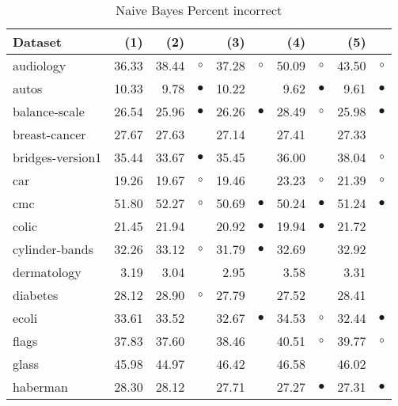 \begin{table}[H]
\caption{\label{nbpi}Naive Bayes Percent incorrect}
\footnotesize
{\centering \begin{tabular}{lrr@{\hspace{0.1cm}}cr@{\hspace{0.1cm}}cr@{\hspace{0.1cm}}cr@{\hspace{0.1cm}}c}
\\
\hline
Dataset & (1)& (2) & & (3) & & (4) & & (5) & \\
\hline
audiology & 36.33 & 38.44 &   $\circ$ & 37.28 &   $\circ$ & 50.09 &    $\circ$ & 43.50 &    $\circ$\\
autos & 10.33 &  9.78 & $\bullet$ & 10.22 &           &  9.62 &  $\bullet$ &  9.61 &  $\bullet$\\
balance-scale & 26.54 & 25.96 & $\bullet$ & 26.26 & $\bullet$ & 28.49 &    $\circ$ & 25.98 &  $\bullet$\\
breast-cancer & 27.67 & 27.63 &           & 27.14 &           & 27.41 &            & 27.33 &           \\
bridges-version1 & 35.44 & 33.67 & $\bullet$ & 35.45 &           & 36.00 &            & 38.04 &    $\circ$\\
car & 19.26 & 19.67 &   $\circ$ & 19.46 &           & 23.23 &    $\circ$ & 21.39 &    $\circ$\\
cmc & 51.80 & 52.27 &   $\circ$ & 50.69 & $\bullet$ & 50.24 &  $\bullet$ & 51.24 &  $\bullet$\\
colic & 21.45 & 21.94 &           & 20.92 & $\bullet$ & 19.94 &  $\bullet$ & 21.72 &           \\
cylinder-bands & 32.26 & 33.12 &   $\circ$ & 31.79 & $\bullet$ & 32.69 &            & 32.92 &           \\
dermatology &  3.19 &  3.04 &           &  2.95 &           &  3.58 &            &  3.31 &           \\
diabetes & 28.12 & 28.90 &   $\circ$ & 27.79 &           & 27.52 &            & 28.41 &           \\
ecoli & 33.61 & 33.52 &           & 32.67 & $\bullet$ & 34.53 &    $\circ$ & 32.44 &  $\bullet$\\
flags & 37.83 & 37.60 &           & 38.46 &           & 40.51 &    $\circ$ & 39.77 &    $\circ$\\
glass & 45.98 & 44.97 &           & 46.42 &           & 46.58 &            & 46.02 &           \\
haberman & 28.30 & 28.12 &           & 27.71 &           & 27.27 &  $\bullet$ & 27.31 &  $\bullet$\\

\end{tabular}}
\end{table}
